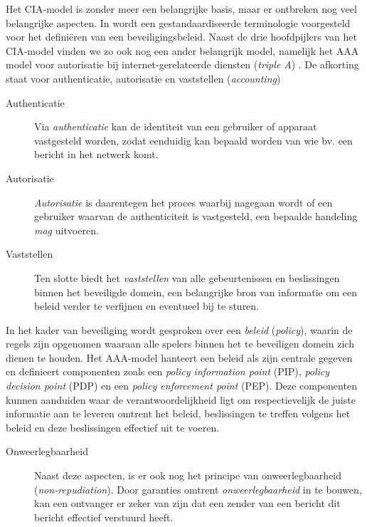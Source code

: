 Het CIA-model is zonder meer een belangrijke basis, maar er ontbreken nog veel
belangrijke aspecten. In \citep{rfc:3198} wordt een gestandaardiseerde
terminologie voorgesteld voor het defini\"eren van een beveiligingsbeleid.
Naast de drie hoofdpijlers van het CIA-model vinden we zo ook nog een ander
belangrijk model, namelijk het AAA model voor autorisatie bij
internet-gerelateerde diensten (\emph{triple A}) \citep{rfc:2904}. De afkorting
staat voor authenticatie, autorisatie en vaststellen (\emph{accounting})

\begin{description}

  \item[Authenticatie] Via \emph{authenticatie} kan de identiteit van een
  gebruiker of apparaat vastgesteld worden, zodat eenduidig kan bepaald worden
  van wie bv. een bericht in het netwerk komt.
  
  \item[Autorisatie] \emph{Autorisatie} is daarentegen het proces waarbij
  nagegaan wordt of een gebruiker waarvan de authenticiteit is vastgesteld, een
  bepaalde handeling \emph{mag} uitvoeren.
  
  \item[Vaststellen] Ten slotte biedt het \emph{vaststellen} van alle
  gebeurtenissen en beslissingen binnen het beveiligde domein, een belangrijke
  bron van informatie om een beleid verder te verfijnen en eventueel bij te
  sturen.

\end{description}

In het kader van beveiliging wordt gesproken over een \emph{beleid}
(\emph{policy}), waarin de regels zijn opgenomen waaraan alle spelers binnen
het te beveiligen domein zich dienen te houden. Het AAA-model hanteert een
beleid als zijn centrale gegeven en definieert componenten zoals een
\emph{policy information point} (PIP), \emph{policy decision point} (PDP) en
een \emph{policy enforcement point} (PEP). Deze componenten kunnen aanduiden
waar de verantwoordelijkheid ligt om respectievelijk de juiste informatie aan
te leveren omtrent het beleid, beslissingen te treffen volgens het beleid en
deze beslissingen effectief uit te voeren.

\begin{description}

  \item[Onweerlegbaarheid] Naast deze aspecten, is er ook nog het principe van
  onweerlegbaarheid (\emph{non-repudiation}). Door garanties omtrent
  \emph{onweerlegbaarheid} in te bouwen, kan een ontvanger er zeker van zijn
  dat een zender van een bericht dit bericht effectief verstuurd heeft.

\end{description}

